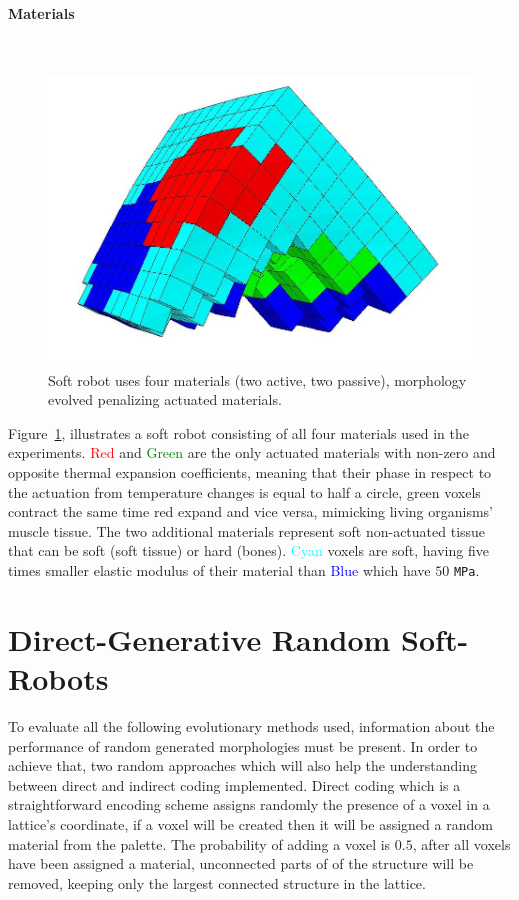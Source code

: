 \paragraph*{Materials}~\\

\begin{figure}
\centering
\includegraphics[height=0.2\textheight]{../Figures/Misc/allSoftMaterials.png}
\caption{Soft robot uses four materials (two active, two passive), morphology evolved penalizing actuated materials.}
\label{fig:allSoftMaterials}
\end{figure}

Figure~\ref{fig:allSoftMaterials}, illustrates a soft robot consisting of all four materials used in the experiments. \textcolor{Red}{Red} and \textcolor{Green}{Green} are the only actuated materials with non-zero and opposite thermal expansion coefficients, meaning that their phase in respect to the actuation from temperature changes is equal to half a circle, green voxels contract the same time red expand and vice versa, mimicking living organisms' muscle tissue. The two additional materials represent soft non-actuated tissue that can be soft (soft tissue) or hard (bones). \textcolor{Cyan}{Cyan} voxels are soft, having five times smaller elastic modulus of their material than \textcolor{Blue}{Blue} which have $50$ \texttt{MPa}.


\section{Direct-Generative Random Soft-Robots}
To evaluate all the following evolutionary methods used, information about the performance of random generated morphologies must be present. In order to achieve that, two random approaches which will also help the understanding between direct and indirect coding implemented. Direct coding which is a straightforward encoding scheme assigns randomly the presence of a voxel in a lattice's coordinate, if a voxel will be created then it will be assigned a random material from the palette. The probability of adding a voxel is $0.5$, after all voxels have been assigned a material, unconnected parts of of the structure will be removed, keeping only the largest connected structure in the lattice.


